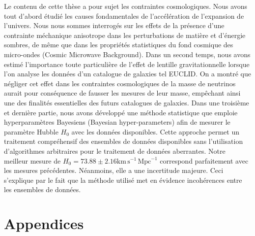 \documentclass[12pt]{report}
\newcommand{\km}{\mathrm{km}}
\newcommand{\second}{\mathrm{s}}
\newcommand{\Mpc}{\mathrm{Mpc}}
\renewcommand{\(}{\left(}
\renewcommand{\)}{\right)}
\renewcommand{\[}{\left[}
\renewcommand{\]}{\right]}
\begin{document}
Le contenu de cette th\`{e}se a pour sujet les contraintes cosmologiques. Nous avons tout d'abord \'{e}tudi\'{e} les  causes fondamentales de l'acc\'{e}l\'{e}ration de l'ex\-pansion de l'univers. Nous nous sommes interrog\'{e}s sur les effets de la pr\'{e}sence d'une contrainte m\'{e}chanique anisotrope dans les perturbations de mati\`{e}re et d'\'{e}nergie sombres, de m\^{e}me que dans les propri\'{e}t\'{e}s statistiques du fond cosmique des micro-ondes (Cosmic Microwave Background). Dans un second temps, nous avons estim\'{e} l'importance toute particuli\`{e}re de l'effet de lentille gravitationnelle lorsque l'on analyse les donn\'{e}es d'un catalogue de galaxies tel EUCLID. On a montr\'{e} que n\'{e}gliger cet effet dans les contraintes cosmologiques de la masse de neutrinos aurait pour cons\'{e}quence de fausser les mesures de leur masse, emp\^{e}chant ainsi une des finalit\'{e}s essentielles des futurs catalogues de galaxies. Dans une troisi\`{e}me et derni\`{e}re partie, nous avons d\'{e}velopp\'{e} une m\'{e}thode statistique que emploie hyperparam\`{e}tres Bayesiens (Bayesian hyper-parameters) afin de mesurer le param\`{e}tre Hubble $H_0$ avec les donn\'{e}es disponibles. Cette approche permet un traitement compr\'{e}hensif des ensembles de donn\'{e}es disponibles sans l'utilisation d'algorithmes arbitraires pour le traitement de donn\'{e}es aberrantes. Notre meilleur mesure de $H_0 = 73.88 \pm 2.16 \km\, \second^{-1}\, \Mpc^{-1}$ correspond parfaitement avec les mesures pr\'{e}c\'{e}dentes. N\'{e}anmoins, elle a une incertitude majeure. Ceci s'explique par le fait que la m\'{e}thode utilis\'{e} met en \'{e}vidence incoh\'{e}rences entre les ensembles de donn\'{e}es. 

\tableofcontents



\newpage




%











\chapter*{Appendices}  

\appendix





%

%


%


%
\end{document}
